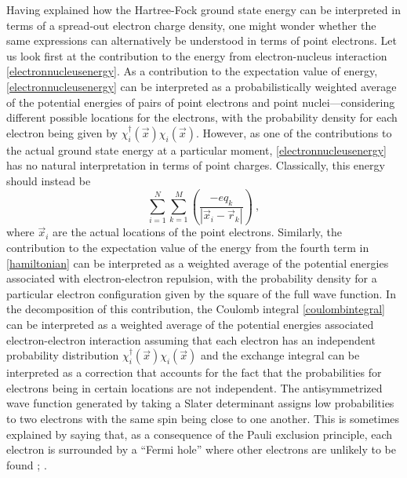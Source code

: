\documentclass[12pt,onecolumn,secnumarabic,amsmath,amssymb,balancelastpage,nofootinbib]{article}
\begin{document}
Having explained how the Hartree-Fock ground state energy can be interpreted in terms of a spread-out electron charge density, one might wonder whether the same expressions can alternatively be understood in terms of point electrons.  Let us look first at the contribution to the energy from electron-nucleus interaction \eqref{electronnucleusenergy}.  As a contribution to the expectation value of energy, \eqref{electronnucleusenergy} can be interpreted as a probabilistically weighted average of the potential energies of pairs of point electrons and point nuclei---considering different possible locations for the electrons, with the probability density for each electron being given by $\chi_i^{\dagger}(\vec{x})\chi_i(\vec{x})$.  However, as one of the contributions to the actual ground state energy at a particular moment, \eqref{electronnucleusenergy} has no natural interpretation in terms of point charges.  Classically, this energy should instead be
\begin{equation}
\sum_{i=1}^{N}\sum_{k=1}^{M}\left(\frac{-e q_k}{|\vec{x}_i-\vec{r}_k|}\right)
\ ,
\label{pointelectronnucleusenergy}
\end{equation}
where $\vec{x}_i$ are the actual locations of the point electrons.  Similarly, the contribution to the expectation value of the energy from the fourth term in \eqref{hamiltonian} can be interpreted as a weighted average of the potential energies associated with electron-electron repulsion, with the probability density for a particular electron configuration given by the square of the full wave function.  In the decomposition of this contribution, the Coulomb integral \eqref{coulombintegral} can be interpreted as a weighted average of the potential energies associated electron-electron interaction assuming that each electron has an independent probability distribution $\chi_i^{\dagger}(\vec{x})\chi_i(\vec{x})$ and the exchange integral can be interpreted as a correction that accounts for the fact that the probabilities for electrons being in certain locations are not independent.  The antisymmetrized wave function generated by taking a Slater determinant assigns low probabilities to two electrons with the same spin being close to one another.  This is sometimes explained by saying that, as a consequence of the Pauli exclusion principle, each electron is surrounded by a ``Fermi hole'' where other electrons are unlikely to be found \cite[pg.\ 218]{lowdin1958}; \cite[sec.\ 17.2]{slatervol2}.
\end{document}
